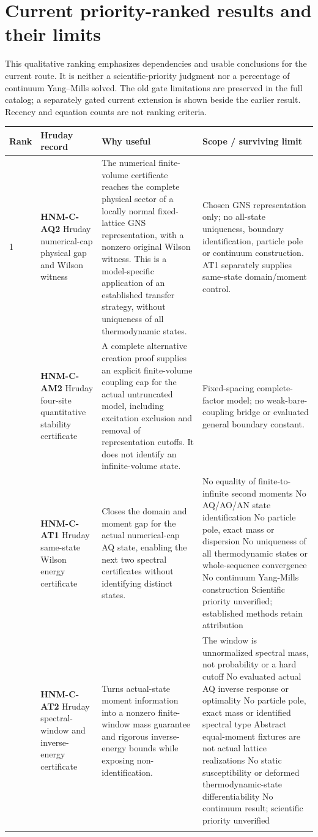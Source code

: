 \section{Current priority-ranked results and their limits}
\label{app:priority}
This qualitative ranking emphasizes dependencies and usable conclusions for the current route. It is neither a scientific-priority judgment nor a percentage of continuum Yang--Mills solved. The old gate limitations are preserved in the full catalog; a separately gated current extension is shown beside the earlier result. Recency and equation counts are not ranking criteria.
\begingroup\small\setlength{\tabcolsep}{3pt}
\begin{longtable}{@{}p{10mm}p{38mm}p{54mm}p{51mm}@{}}
\toprule Rank & Hruday record & Why useful & Scope / surviving limit\\\midrule\endhead
1 & \textbf{HNM-C-AQ2} Hruday numerical-cap physical gap and Wilson witness & The numerical finite-volume certificate reaches the complete physical sector of a locally normal fixed-lattice GNS representation, with a nonzero original Wilson witness. This is a model-specific application of an established transfer strategy, without uniqueness of all thermodynamic states. & Chosen GNS representation only; no all-state uniqueness, boundary identification, particle pole or continuum construction. AT1 separately supplies same-state domain/moment control.\\\addlinespace
2 & \textbf{HNM-C-AM2} Hruday four-site quantitative stability certificate & A complete alternative creation proof supplies an explicit finite-volume coupling cap for the actual untruncated model, including excitation exclusion and removal of representation cutoffs. It does not identify an infinite-volume state. & Fixed-spacing complete-factor model; no weak-bare-coupling bridge or evaluated general boundary constant.\\\addlinespace
3 & \textbf{HNM-C-AT1} Hruday same-state Wilson energy certificate & Closes the domain and moment gap for the actual numerical-cap AQ state, enabling the next two spectral certificates without identifying distinct states. & No equality of finite-to-infinite second moments No AQ/AO/AN state identification No particle pole, exact mass or dispersion No uniqueness of all thermodynamic states or whole-sequence convergence No continuum Yang-Mills construction Scientific priority unverified; established methods retain attribution\\\addlinespace
4 & \textbf{HNM-C-AT2} Hruday spectral-window and inverse-energy certificate & Turns actual-state moment information into a nonzero finite-window mass guarantee and rigorous inverse-energy bounds while exposing non-identification. & The window is unnormalized spectral mass, not probability or a hard cutoff No evaluated actual AQ inverse response or optimality No particle pole, exact mass or identified spectral type Abstract equal-moment fixtures are not actual lattice realizations No static susceptibility or deformed thermodynamic-state differentiability No continuum result; scientific priority unverified\\\addlinespace

\end{longtable}
